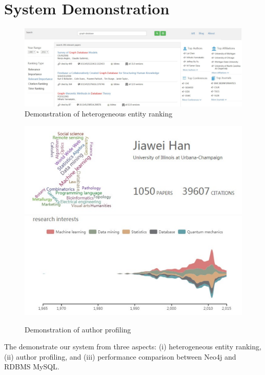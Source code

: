 \section{System Demonstration}
\label{sec-demo}

\begin{figure}[tp]
\centering
\includegraphics[width=\textwidth]{searchKeywords.pdf}
\caption{Demonstration of heterogeneous entity ranking}
\label{fig:searchKeywords}
\vspace{-3ex}
\end{figure}

\begin{figure}
\centering
\includegraphics[width=0.8\columnwidth]{hjwAvatar.pdf}
\includegraphics[width=0.8\columnwidth]{hjwInterest.pdf}
\caption{Demonstration of author profiling}
\label{fig:hjwProfile}
\vspace{-3ex}
\end{figure}

The demonstrate our system from three aspects: (i) heterogeneous entity ranking, (ii) author profiling, and (iii) performance comparison between Neo4j and RDBMS MySQL.


